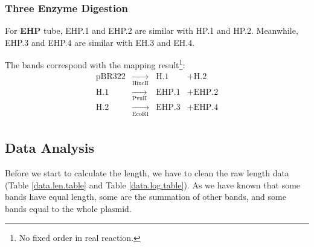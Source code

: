 \documentclass{article}
\begin{document}
            \subsubsection{Three Enzyme Digestion}
                For \textbf{EHP} tube, EHP.1 and EHP.2 are similar with HP.1 and HP.2. Meanwhile, EHP.3 and EHP.4 are similar with EH.3 and EH.4.

                The bands correspond with the mapping result\footnote{No fixed order in real reaction.}:
                $$\begin{aligned}
                \text{pBR322}&\underset{\text{HincII}}{\rightarrow}&\text{H.1} &+ \text{H.2}\\
                \text{H.1}&\underset{\text{PvuII}}{\rightarrow}&\text{EHP.1} &+ \text{EHP.2}\\
                \text{H.2}&\underset{\text{EcoR1}}{\rightarrow}&\text{EHP.3} &+ \text{EHP.4}\\
                \end{aligned}$$

        \subsection{Data Analysis}
            Before we start to calculate the length, we have to clean the raw length data (Table \ref{data.len.table} and Table \ref{data.log.table}). As we have known that some bands have equal length, some are the summation of other bands, and some bands equal to the whole plasmid.
\end{document}
